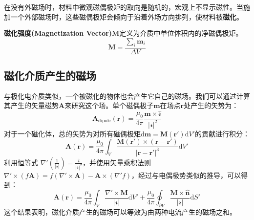\documentclass[fontset=none]{ctexart}
\begin{document}
在没有外磁场时，材料中微观磁偶极矩的取向是随机的，宏观上不显示磁性。当施加一个外部磁场时，这些磁偶极矩会倾向于沿着外场方向排列，使材料被\textbf{磁化}。

\begin{definition}[磁化强度矢量]
    \textbf{磁化强度(Magnetization Vector)}$\bm{M}$定义为介质中单位体积内的净磁偶极矩。
    \begin{equation}
        \bm{M} = \frac{\sum_i \bm{m}_i}{\Delta V}
    \end{equation}
\end{definition}

\subsection{磁化介质产生的磁场}
与极化电介质类似，一个被磁化的物体也会产生它自己的磁场。我们可以通过计算其产生的矢量磁势$\bm{A}$来研究这个场。单个磁偶极子$\bm{m}$在场点$\bm{r}$处产生的矢势为：
\begin{equation}
    \bm{A}_{\text{dipole}}(\bm{r}) = \frac{\mu_0}{4\pi} \frac{\bm{m} \times \hat{\bm{\mathscr{r}}}}{|\bm{\mathscr{r}}|^2}
\end{equation}
对于一个磁化体，总的矢势为对所有磁偶极矩$\mathrm{d}\bm{m} = \bm{M}(\bm{r}')\mathrm{d}V'$的贡献进行积分：
\begin{equation}
    \bm{A}(\bm{r}) = \frac{\mu_0}{4\pi} \int_V \frac{\bm{M}(\bm{r}') \times (\bm{r}-\bm{r}')}{|\bm{r}-\bm{r}'|^3} \mathrm{d}V'
\end{equation}
利用恒等式 $\nabla' \left(\frac{1}{|\bm{\mathscr{r}}|}\right) = \frac{\hat{\bm{\mathscr{r}}}}{|\bm{\mathscr{r}}|^2}$，并使用矢量乘积法则 $\nabla' \times (f\bm{A}) = f(\nabla' \times \bm{A}) - \bm{A} \times (\nabla' f)$，经过与电偶极势类似的推导，可以得到：
\begin{equation}
    \bm{A}(\bm{r}) = \frac{\mu_0}{4\pi} \int_V \frac{\nabla' \times \bm{M}}{|\bm{\mathscr{r}}|} \mathrm{d}V' + \frac{\mu_0}{4\pi} \oint_{\partial V} \frac{\bm{M} \times \hat{\bm{n}}}{|\bm{\mathscr{r}}|} \mathrm{d}S'
\end{equation}
这个结果表明，磁化介质产生的磁场可以等效为由两种电流产生的磁场之和。
\end{document}
